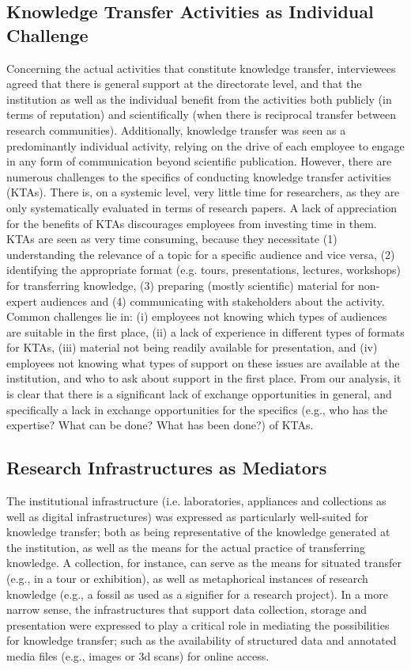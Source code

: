 \documentclass{article}
\begin{document}
\subsection{Knowledge Transfer Activities as Individual Challenge}
Concerning the actual activities that constitute knowledge transfer, interviewees agreed that there is general support at the directorate level, and that the institution as well as the individual benefit from the activities both publicly (in terms of reputation) and scientifically (when there is reciprocal transfer between research communities). Additionally, knowledge transfer was seen as a predominantly individual activity, relying on the drive of each employee to engage in any form of communication beyond scientific publication. However, there are numerous challenges to the specifics of conducting knowledge transfer activities (KTAs). There is, on a systemic level, very little time for researchers, as they are only systematically evaluated in terms of research papers. A lack of appreciation for the benefits of KTAs discourages employees from investing time in them. KTAs are seen as very time consuming, because they necessitate (1) understanding the relevance of a topic for a specific audience and vice versa, (2) identifying the appropriate format (e.g. tours, presentations, lectures, workshops) for transferring knowledge, (3) preparing (mostly scientific) material for non-expert audiences and (4) communicating with stakeholders about the activity. Common challenges lie in: (i) employees not knowing which types of audiences are suitable in the first place, (ii) a lack of experience in different types of formats for KTAs, (iii) material not being readily available for presentation, and (iv) employees not knowing what types of support on these issues are available at the institution, and who to ask about support in the first place. From our analysis, it is clear that there is a significant lack of exchange opportunities in general, and specifically a lack in exchange opportunities for the specifics (e.g., who has the expertise? What can be done? What has been done?) of KTAs.

\subsection{Research Infrastructures as Mediators}
The institutional infrastructure (i.e. laboratories, appliances and collections as well as digital infrastructures) was expressed as particularly well-suited for knowledge transfer; both as being representative of the knowledge generated at the institution, as well as the means for the actual practice of transferring knowledge. A collection, for instance, can serve as the means for situated transfer (e.g., in a tour or exhibition), as well as metaphorical instances of research knowledge (e.g., a fossil as used as a signifier for a research project). In a more narrow sense, the infrastructures that support data collection, storage and presentation were expressed to play a critical role in mediating the possibilities for knowledge transfer; such as the availability of structured data and annotated media files (e.g., images or 3d scans) for online access.
\end{document}
